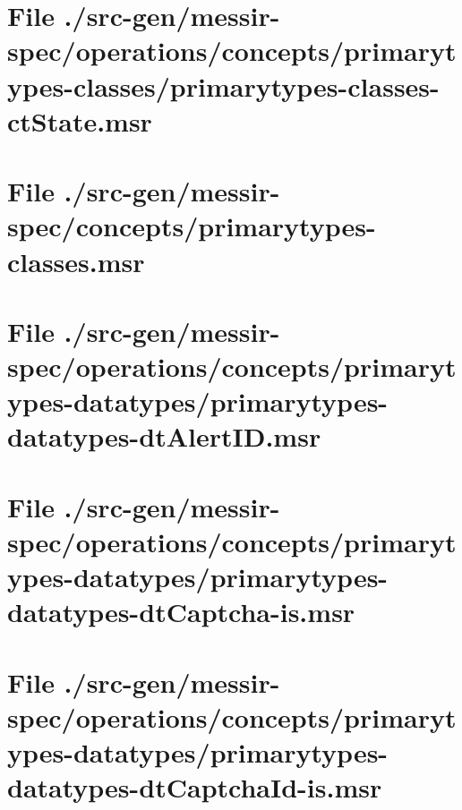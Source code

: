 \section[File /src-gen/messir-spec/operations.../primarytypes-classes-ctState.msr]{File ./src-gen/messir-spec/operations/concepts/primarytypes-classes/primarytypes-classes-ctState.msr}
\scriptsize

\normalsize
	
\section[File /src-gen/messir-spec/concepts/primarytypes-classes.msr]{File ./src-gen/messir-spec/concepts/primarytypes-classes.msr}
\scriptsize

\normalsize
	
\section[File /src-gen/messir-spec/operations.../primarytypes-datatypes-dtAlertID.msr]{File ./src-gen/messir-spec/operations/concepts/primarytypes-datatypes/primarytypes-datatypes-dtAlertID.msr}
\scriptsize

\normalsize
	
\section[File /src-gen/messir-spec/operations.../primarytypes-datatypes-dtCaptcha-is.msr]{File ./src-gen/messir-spec/operations/concepts/primarytypes-datatypes/primarytypes-datatypes-dtCaptcha-is.msr}
\scriptsize

\normalsize
	
\section[File /src-gen/messir-spec.../primarytypes-datatypes-dtCaptchaId-is.msr]{File ./src-gen/messir-spec/operations/concepts/primarytypes-datatypes/primarytypes-datatypes-dtCaptchaId-is.msr}
\scriptsize

\normalsize
	
